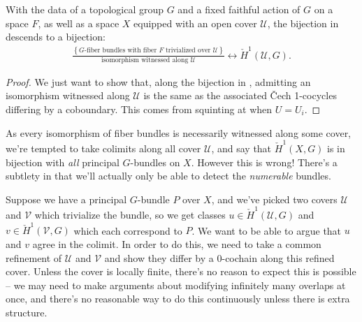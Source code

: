 \documentclass[11pt]{amsart}
\begin{document}
\begin{theorem}\label{thm:nonabelian-h1-cech-cover} 
With the data of a topological group $G$ and a fixed faithful action of $G$ on a space $F$, as well as a space $X$ equipped with an open cover $\mathcal{U}$, the bijection in  descends to a bijection:
\begin{equation}\label{eqn:cech-cohomology-fiber-bundles-along-cover}
\begin{aligned}
    \frac{\left\{ G\text{-fiber bundles with fiber }F\text{ trivialized over }\mathcal{U} \right\}}{\text{isomorphism witnessed along }\mathcal{U}} \leftrightarrow \check{H}^1(\mathcal{U},G).
\end{aligned}
\end{equation}
\end{theorem}
\begin{proof} We just want to show that, along the bijection in , admitting an isomorphism witnessed along $\mathcal{U}$ is the same as the associated \v{C}ech 1-cocycles differing by a coboundary. This comes from squinting at  when $U = U_i$.
\end{proof}


As every isomorphism of fiber bundles is necessarily witnessed along some cover, we're tempted to take colimits along all cover $\mathcal{U}$, and say that $\check{H}^1(X,G)$ is in bijection with \emph{all} principal $G$-bundles on $X$. However this is wrong! There's a subtlety in that we'll actually only be able to detect the \emph{numerable} bundles.

\begin{remark} Suppose we have a principal $G$-bundle $P$ over $X$, and we've picked two covers $\mathcal{U}$ and $\mathcal{V}$ which trivialize the bundle, so we get classes $u\in \check{H}^1(\mathcal{U},G)$ and $v \in \check{H}^1(\mathcal{V},G)$ which each correspond to $P$. We want to be able to argue that $u$ and $v$ agree in the colimit. In order to do this, we need to take a common refinement of $\mathcal{U}$ and $\mathcal{V}$ and show they differ by a 0-cochain along this refined cover. Unless the cover is locally finite, there's no reason to expect this is possible -- we may need to make arguments about modifying infinitely many overlaps at once, and there's no reasonable way to do this continuously unless there is extra structure.
\end{remark}
\end{document}
